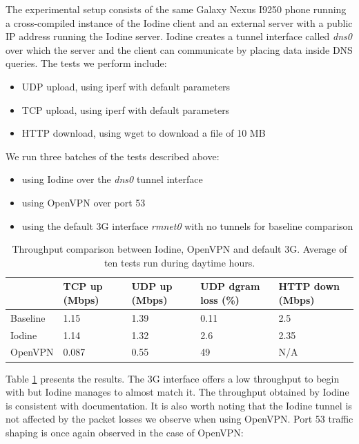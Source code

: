 The experimental setup consists of the same Galaxy Nexus I9250 phone running a
cross-compiled instance of the Iodine client and an external server with a
public IP address running the Iodine server. Iodine creates  a tunnel interface called \textit{dns0} over which the server and the client can communicate by placing data inside DNS queries. The tests we perform include:

\begin{itemize}
\item UDP upload, using iperf with default parameters
\item TCP upload, using iperf with default parameters
\item HTTP download, using wget to download a file of 10 MB
\end{itemize}

We run three batches of the tests described above:

\begin{itemize}
\item using Iodine over the \textit{dns0} tunnel interface
\item using OpenVPN over port 53
\item using the default 3G interface \textit{rmnet0} with no tunnels for baseline comparison
\end{itemize}


\begin{center}
	\begin{table}[htb]
	\centering
	\begin{tabular}{ | l | l | l | l | l | }
	\hline
	& TCP up (Mbps) & UDP up (Mbps) & UDP dgram loss (\%) & HTTP down (Mbps) \\ \hline
	Baseline & 1.15 & 1.39 &  0.11 & 2.5 \\ \hline
	Iodine & 1.14 & 1.32 & 2.6 & 2.35 \\ \hline
	OpenVPN & 0.087 & 0.55 & 49 & N/A \\ \hline
	\end{tabular}
	\caption{Throughput comparison between Iodine, OpenVPN and default 3G. Average of ten tests run during daytime hours.}
	\label{table:iodine}
	\end{table}
\end{center}
	
Table \ref{table:iodine} presents the results. The 3G interface offers a low
throughput to begin with but Iodine manages to almost match it. The throughput
obtained by Iodine is consistent with documentation. It is also worth noting
that the Iodine tunnel is not affected by the packet losses we observe when
using OpenVPN. Port 53 traffic shaping is once again observed in the case of
OpenVPN:

